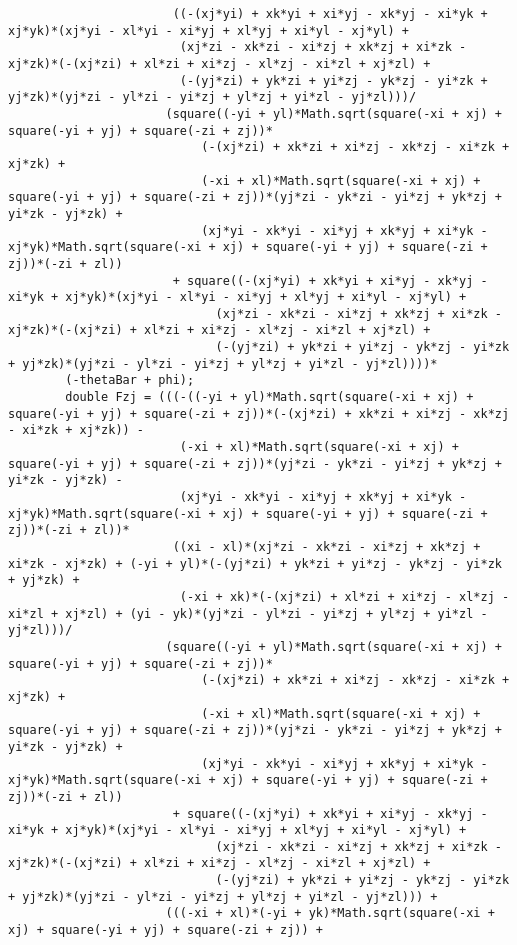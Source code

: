 \begin{lstlisting}
					   ((-(xj*yi) + xk*yi + xi*yj - xk*yj - xi*yk + xj*yk)*(xj*yi - xl*yi - xi*yj + xl*yj + xi*yl - xj*yl) + 
						(xj*zi - xk*zi - xi*zj + xk*zj + xi*zk - xj*zk)*(-(xj*zi) + xl*zi + xi*zj - xl*zj - xi*zl + xj*zl) + 
						(-(yj*zi) + yk*zi + yi*zj - yk*zj - yi*zk + yj*zk)*(yj*zi - yl*zi - yi*zj + yl*zj + yi*zl - yj*zl)))/
					  (square((-yi + yl)*Math.sqrt(square(-xi + xj) + square(-yi + yj) + square(-zi + zj))*
						   (-(xj*zi) + xk*zi + xi*zj - xk*zj - xi*zk + xj*zk) + 
						   (-xi + xl)*Math.sqrt(square(-xi + xj) + square(-yi + yj) + square(-zi + zj))*(yj*zi - yk*zi - yi*zj + yk*zj + yi*zk - yj*zk) + 
						   (xj*yi - xk*yi - xi*yj + xk*yj + xi*yk - xj*yk)*Math.sqrt(square(-xi + xj) + square(-yi + yj) + square(-zi + zj))*(-zi + zl))
					   + square((-(xj*yi) + xk*yi + xi*yj - xk*yj - xi*yk + xj*yk)*(xj*yi - xl*yi - xi*yj + xl*yj + xi*yl - xj*yl) + 
							 (xj*zi - xk*zi - xi*zj + xk*zj + xi*zk - xj*zk)*(-(xj*zi) + xl*zi + xi*zj - xl*zj - xi*zl + xj*zl) + 
							 (-(yj*zi) + yk*zi + yi*zj - yk*zj - yi*zk + yj*zk)*(yj*zi - yl*zi - yi*zj + yl*zj + yi*zl - yj*zl))))*
		(-thetaBar + phi);
		double Fzj = (((-((-yi + yl)*Math.sqrt(square(-xi + xj) + square(-yi + yj) + square(-zi + zj))*(-(xj*zi) + xk*zi + xi*zj - xk*zj - xi*zk + xj*zk)) - 
						(-xi + xl)*Math.sqrt(square(-xi + xj) + square(-yi + yj) + square(-zi + zj))*(yj*zi - yk*zi - yi*zj + yk*zj + yi*zk - yj*zk) - 
						(xj*yi - xk*yi - xi*yj + xk*yj + xi*yk - xj*yk)*Math.sqrt(square(-xi + xj) + square(-yi + yj) + square(-zi + zj))*(-zi + zl))*
					   ((xi - xl)*(xj*zi - xk*zi - xi*zj + xk*zj + xi*zk - xj*zk) + (-yi + yl)*(-(yj*zi) + yk*zi + yi*zj - yk*zj - yi*zk + yj*zk) + 
						(-xi + xk)*(-(xj*zi) + xl*zi + xi*zj - xl*zj - xi*zl + xj*zl) + (yi - yk)*(yj*zi - yl*zi - yi*zj + yl*zj + yi*zl - yj*zl)))/
					  (square((-yi + yl)*Math.sqrt(square(-xi + xj) + square(-yi + yj) + square(-zi + zj))*
						   (-(xj*zi) + xk*zi + xi*zj - xk*zj - xi*zk + xj*zk) + 
						   (-xi + xl)*Math.sqrt(square(-xi + xj) + square(-yi + yj) + square(-zi + zj))*(yj*zi - yk*zi - yi*zj + yk*zj + yi*zk - yj*zk) + 
						   (xj*yi - xk*yi - xi*yj + xk*yj + xi*yk - xj*yk)*Math.sqrt(square(-xi + xj) + square(-yi + yj) + square(-zi + zj))*(-zi + zl))
					   + square((-(xj*yi) + xk*yi + xi*yj - xk*yj - xi*yk + xj*yk)*(xj*yi - xl*yi - xi*yj + xl*yj + xi*yl - xj*yl) + 
							 (xj*zi - xk*zi - xi*zj + xk*zj + xi*zk - xj*zk)*(-(xj*zi) + xl*zi + xi*zj - xl*zj - xi*zl + xj*zl) + 
							 (-(yj*zi) + yk*zi + yi*zj - yk*zj - yi*zk + yj*zk)*(yj*zi - yl*zi - yi*zj + yl*zj + yi*zl - yj*zl))) + 
					  (((-xi + xl)*(-yi + yk)*Math.sqrt(square(-xi + xj) + square(-yi + yj) + square(-zi + zj)) + 

\end{lstlisting}

